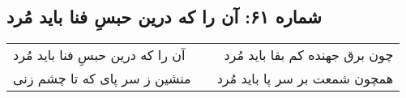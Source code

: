 \begin{center}
\section*{شماره ۶۱: آن را که درین حبسِ فنا باید مُرد}
\label{sec:061}
\begin{longtable}{l p{0.5cm} r}
آن را که درین حبسِ فنا باید مُرد
&&
چون برق جهنده کم بقا باید مُرد
\\
منشین ز سر پای که تا چشم زنی
&&
همچون شمعت بر سر پا باید مُرد
\\
\end{longtable}
\end{center}
